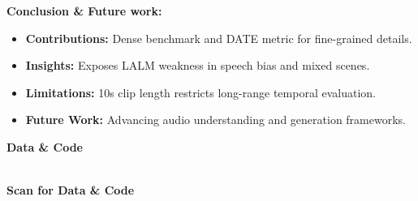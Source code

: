 \textbf{Conclusion \& Future work:}
\begin{itemize}
    \item \textbf{Contributions:} Dense benchmark and DATE metric for fine-grained details.
    \item \textbf{Insights:} Exposes LALM weakness in speech bias and mixed scenes.
    \item \textbf{Limitations:} 10s clip length restricts long-range temporal evaluation.
    \item \textbf{Future Work:} Advancing audio understanding and generation frameworks.
\end{itemize}

\vspace{0.6cm}
\textbf{Data \& Code}
\vspace{2.5cm}

\begin{center}
\begin{minipage}[c]{0.72\linewidth}
    \centering
    \qrcode{\PosterRepositoryUrl} \\
    \vspace{1.0 cm}
    \textbf{Scan for Data \& Code}
\end{minipage}
\end{center}
